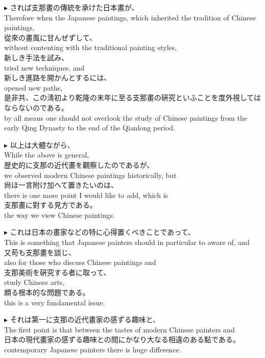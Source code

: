 \documentclass{ctexart}
\makeatletter
\newcommand*{\shifttext}[1]{%
  \settowidth{\@tempdima}{#1}%
  \hspace{-\@tempdima}#1%
}
\newcommand{\plabel}[1]{%
\shifttext{\textbf{#1}\quad}%
}
\newcommand{\prule}{%
\begin{center}%
\hdashrule[0.5ex]{.99\linewidth}{1pt}{1pt 2.5pt}%
\end{center}%
}
\makeatother
\begin{document}
\vspace{1em}
\plabel{$\blacktriangleright$}%
されば支那畫の傳統を承けた日本畫が、\\
Therefore when the Japanese paintings, which inherited the tradition of Chinese paintings,\\
從來の畫風に甘んぜずして、\\
without contenting with the traditional painting styles,\\
新しき手法を試み、\\
tried new techniques, and\\
新しき進路を開かんとするには、\\
opened new paths,\\
是非共、この淸初より乾隆の末年に至る支那畫の硏究といふことを度外視してはならないのである。\\
by all means one should not overlook the study of Chinese paintings from the early Qing Dynasty to the end of the Qianlong period.

\prule
\plabel{$\blacktriangleright$}%
以上は大體ながら、\\
While the above is general,\\
歴史的に支那の近代畫を觀察したのであるが、\\
we observed modern Chinese paintings historically, but\\
尙ほ一言附け加へて置きたいのは、\\
there is one more point I would like to add, which is\\
支那畫に對する見方である。\\
the way we view Chinese paintings.

\vspace{1em}
\plabel{$\blacktriangleright$}%
これは日本の畫家などの特に心得置くべきことであって、\\
This is something that Japanese painters should in particular to aware of, and\\
又苟も支那畫を談じ、\\
also for those who discuss Chinese paintings and\\
支那美術を硏究する者に取って、\\
study Chinese arts,\\
頗る根本的な問題である。\\
this is a very fundamental issue.

\vspace{1em}
\plabel{$\blacktriangleright$}%
それは第一に支那の近代畫家の感ずる趣味と、\\
The first point is that between the tastes of modern Chinese painters and\\
日本の現代畫家の感ずる趣味との間にかなり大なる相違のある點である。\\
contemporary Japanese painters there is huge difference.
\end{document}
